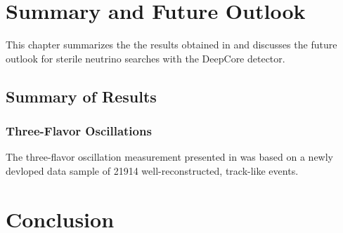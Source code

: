 \setchapterpreamble[u]{\margintoc}
\chapter{Summary and Future Outlook}

This chapter summarizes the the results obtained in  and discusses the future outlook for sterile neutrino searches with the DeepCore detector.

\section{Summary of Results}
\label{sec:summary}

\subsection{Three-Flavor Oscillations}
\label{sec:summary-three-flavor}

The three-flavor oscillation measurement presented in  was based on a newly devloped data sample of \num{21914} well-reconstructed, track-like events. 

\chapter{Conclusion}
